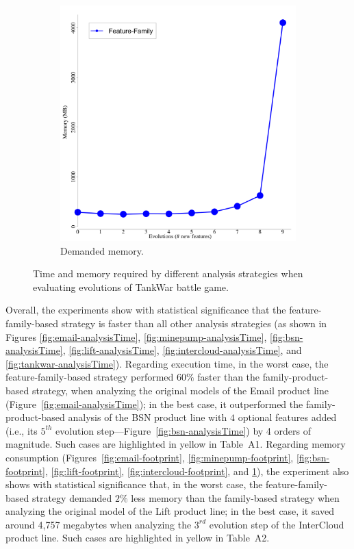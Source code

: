 \begin{figure}[p]
\begin{subfigure}[t]{0.5\columnwidth}
    \includegraphics[width=1.0\columnwidth]{img/tankwarSpace}
    \caption{Demanded memory.}
    \label{fig:tankwar-footprint}
  \end{subfigure}
  \caption{Time and memory required by different analysis strategies when
  evaluating evolutions of TankWar battle game.}
  \label{fig:tankwar-scalability}
\end{figure}


Overall, the experiments show with statistical significance that the
feature-family-based strategy is faster than all other analysis strategies (as
shown in Figures \ref{fig:email-analysisTime}, \ref{fig:minepump-analysisTime},
\ref{fig:bsn-analysisTime}, \ref{fig:lift-analysisTime},
\ref{fig:intercloud-analysisTime}, and \ref{fig:tankwar-analysisTime}).
Regarding execution time, in the worst case, the feature-family-based strategy
performed $60\%$ faster than the family-product-based strategy, when analyzing
the original models of the Email product line
(Figure~\ref{fig:email-analysisTime}); in the best case, it outperformed the
family-product-based analysis of the BSN product line with $4$ optional features
added (i.e., its $5^{th}$ evolution step---Figure~\ref{fig:bsn-analysisTime}) by
4 orders of magnitude. Such cases are highlighted in yellow in
Table~A1.  Regarding memory consumption
(Figures~\ref{fig:email-footprint}, \ref{fig:minepump-footprint},
\ref{fig:bsn-footprint}, \ref{fig:lift-footprint},
\ref{fig:intercloud-footprint}, and \ref{fig:tankwar-footprint}), the experiment
also shows with statistical significance that,   in the worst case, the
feature-family-based strategy demanded $2\%$ less memory than the family-based
strategy when analyzing the original model of the Lift product line; in the best
case, it saved around 4,757 megabytes when analyzing the $3^{rd}$ evolution step
of the InterCloud product line. Such cases are highlighted in yellow in
Table~A2.

